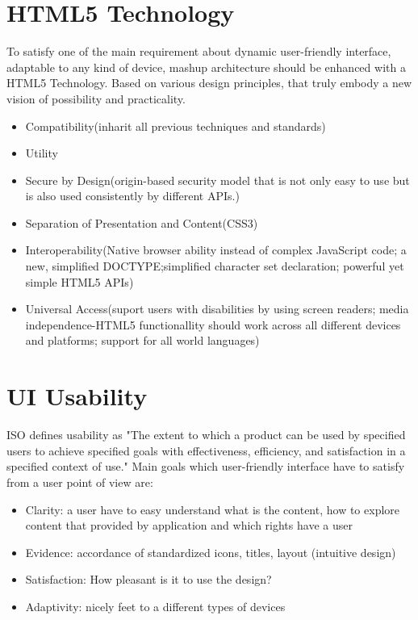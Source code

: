 \section{HTML5 Technology}
To satisfy one of the main requirement about dynamic user-friendly interface, adaptable to any kind of device, mashup architecture should be enhanced with a HTML5 Technology. Based on various design principles, that truly embody a new vision of possibility and practicality\cite{hickson2011html5}.
\begin{itemize}
\item Compatibility(inharit all previous techniques and standards)
\item Utility
\item Secure by Design(origin-based security model that is not only easy to use but is also used consistently by different APIs.)
\item Separation of Presentation and Content(CSS3)
\item Interoperability(Native browser ability instead of complex JavaScript code; a new, simplified DOCTYPE;simplified character set declaration; powerful yet simple HTML5 APIs)
\item Universal Access(suport users with disabilities by using screen readers; media independence-HTML5 functionallity should work across all different devices and platforms; support for all world languages)
\end{itemize}

\section {UI Usability}
ISO defines usability as "The extent to which a product can be used by specified users to achieve specified goals with effectiveness, efficiency, and satisfaction in a specified context of use."
Main goals which user-friendly interface have to satisfy from a user point of view are\cite{baxter2012human,jakob,visdesign}:
\begin{itemize}
\item Clarity: a user have to easy understand what is the content, how to explore content that provided by application and which rights have a user
\item Evidence: accordance of standardized icons, titles, layout (intuitive design)
\item Satisfaction: How pleasant is it to use the design?
\item Adaptivity: nicely feet to a different types of devices
\end{itemize}

